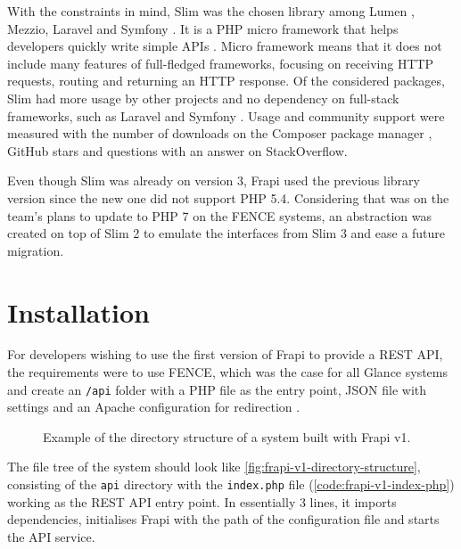 With the constraints in mind, Slim was the chosen library among Lumen \cite{lumen-website}, Mezzio\cite{mezzio-website}, Laravel\cite{laravel-website} and Symfony \cite{symfony-website}. It is a PHP micro framework that helps developers quickly write simple APIs \cite{slim-website}. Micro framework means that it does not include many features of full-fledged frameworks, focusing on receiving HTTP requests, routing and returning an HTTP response. Of the considered packages, Slim had more usage by other projects and no dependency on full-stack frameworks, such as Laravel \cite{laravel-website} and Symfony \cite{symfony-website}. Usage and community support were measured with the number of downloads on the Composer package manager \cite{composer-website}, GitHub stars and questions with an answer on StackOverflow.

Even though Slim was already on version 3, Frapi used the previous library version since the new one did not support PHP 5.4. Considering that was on the team's plans to update to PHP 7 on the FENCE systems, an abstraction was created on top of Slim 2 \cite{slim-2-doc} to emulate the interfaces from Slim 3 and ease a future migration.

\section{Installation}
\label{sec:frapi-v1-installation}

For developers wishing to use the first version of Frapi to provide a REST API, the requirements were to use FENCE, which was the case for all Glance systems and create an \texttt{/api} folder with a PHP file as the entry point, JSON file with settings and an Apache configuration for redirection \cite{frapi-v1-setup-documentation}.

\begin{figure}
\centering
\begin{minipage}{0.9\textwidth}
\end{minipage}
\caption{Example of the directory structure of a system built with Frapi v1.}
\label{fig:frapi-v1-directory-structure}
\end{figure}

The file tree of the system should look like \autoref{fig:frapi-v1-directory-structure}, consisting of the \texttt{api} directory with the \texttt{index.php} file (\autoref{code:frapi-v1-index-php}) working as the REST API entry point. In essentially 3 lines, it imports dependencies, initialises Frapi with the path of the configuration file and starts the API service.

